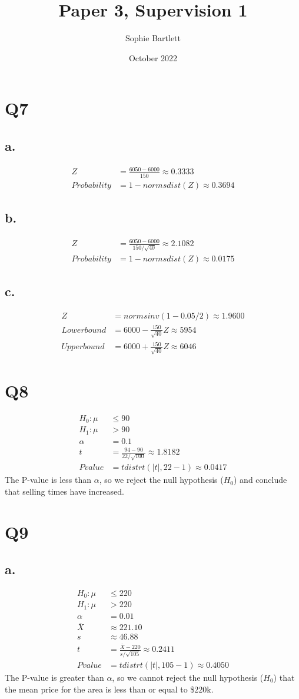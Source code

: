 \documentclass[11pt,a4paper]{article}
\title{Paper 3, Supervision 1}
\author{Sophie Bartlett}
\date {October 2022}
\begin{document}
\section*{Q7}
\subsection*{a.}
\begin{align*}
Z &= \frac{6050 - 6000}{150} \approx 0.3333 \\
Probability &= 1 - normsdist(Z) \approx 0.3694
\end{align*}
\subsection*{b.}
\begin{align*}
Z &= \frac{6050 - 6000}{150 / \sqrt{40}} \approx 2.1082 \\
Probability &= 1 - normsdist(Z) \approx 0.0175
\end{align*}
\subsection*{c.}
\begin{align*}
Z &= normsinv(1-0.05/2) \approx 1.9600 \\
Lower bound &= 6000 - \frac{150}{\sqrt{40}}Z \approx 5954 \\
Upper bound &= 6000 + \frac{150}{\sqrt{40}}Z \approx 6046
\end{align*}
\section*{Q8}
\begin{align*}
H_0: \mu &\leq 90 \\
H_1: \mu &> 90 \\
\alpha &= 0.1 \\
t &= \frac{94-90}{22/\sqrt{100}} \approx 1.8182 \\
Pvalue &= tdistrt(|t|, 22-1) \approx 0.0417
\end{align*}
The P-value is less than $\alpha$, so we reject the null hypothesis ($H_0$) and conclude
that selling times have increased.
\section*{Q9}
\subsection*{a.}
\begin{align*}
H_0: \mu &\leq 220 \\
H_1: \mu &> 220 \\
\alpha &= 0.01 \\
\overline{X} &\approx 221.10 \\
s &\approx 46.88 \\
t &= \frac{\overline{X} - 220}{s/\sqrt{105}} \approx 0.2411 \\
Pvalue &= tdistrt(|t|, 105-1) \approx 0.4050
\end{align*}
The P-value is greater than $\alpha$, so we cannot reject the null hypothesis ($H_0$) that
the mean price for the area is less than or equal to \$220k.
\end{document}
